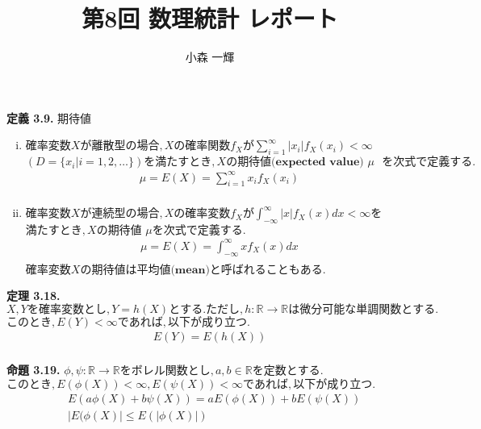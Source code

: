 \documentclass[dvipdfmx,10pt, a4j]{jarticle}
\title{第8回 数理統計 レポート}
\author{小森 一輝}
\theoremstyle{definition}
\begin{document}
\maketitle

\setcounter{section}{2}

\noindent
\textbf{定義 3.9.} 期待値\\
\begin{enumerate}[i)]
    \item $確率変数X が離散型の場合, Xの確率関数f_Xが \sum_{i=1}^{\infty}{|x_i| f_X(x_i)} < \infty$
          $(D = \{x_i| i = 1,2,\dots \})を満たすとき, Xの \textbf{期待値(expected value) $\mu$ }を次式で定義する.$\\
          \begin{align*}
              \mu = E(X) = \sum_{i=1}^{\infty}{x_i f_X(x_i)} \\
          \end{align*}
    \item $確率変数Xが連続型の場合, Xの確率変数 f_X が \int_{-\infty}^{\infty}{|x|f_X(x)dx} < \infty を$
          $満たすとき,Xの \textbf{期待値 $\mu$}を次式で定義する.$\\
          \begin{align*}
              \mu = E(X) = \int_{-\infty}^{\infty}{xf_X(x)dx} \\
          \end{align*}
          $確率変数Xの期待値は \textbf{平均値(mean)}と呼ばれることもある.$\\
\end{enumerate}

\noindent
\textbf{定理 3.18.} $X, Yを確率変数とし, Y=h(X)とする. ただし, h: \mathbb{R} \to \mathbb{R} は微分可能な単調関数とする.$
$このとき, E(Y) < \infty であれば, 以下が成り立つ.$\\
\begin{align*}
    E(Y) = E(h(X)) \\
\end{align*}

\noindent
\textbf{命題 3.19.} $\phi, \psi: \mathbb{R} \to \mathbb{R} をボレル関数とし, a, b \in \mathbb{R} を定数とする.$
$このとき, E(\phi(X)) < \infty, E(\psi(X)) < \infty であれば, 以下が成り立つ.$\\
\begin{align*}
     & E(a\phi(X) + b\psi(X)) = aE(\phi(X)) + bE(\psi(X)) \\
     & |E(\phi(X)| \leq E(|\phi(X)|)                      \\
\end{align*}
\end{document}
